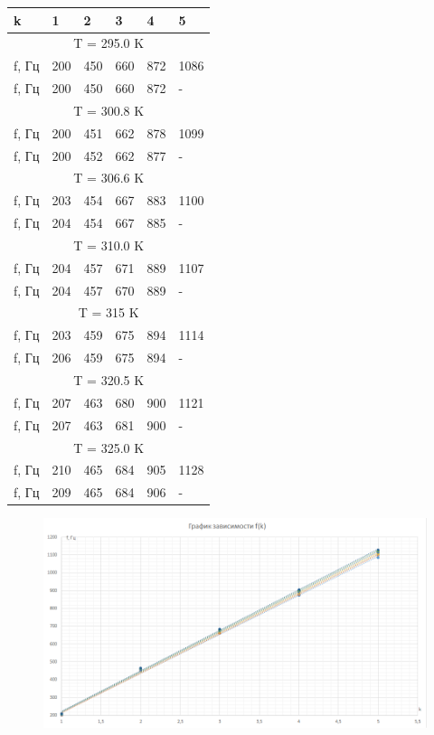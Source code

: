 \documentclass[12pt,a4paper]{article}
\begin{document}
\begin{center}

\begin{tabular}{|p{}|p{}|p{}|p{}|p{}|p{}|}
\hline 
k & 1  & 2 & 3 & 4 & 5 \\ 
\hline 
\multicolumn{6}{|c|}{T = 295.0 K} \\ 
\hline 
f, Гц  & 200 & 450 & 660 & 872 & 1086 \\ 
\hline 
f, Гц  & 200 & 450 & 660 & 872 & - \\ 
\hline 
\multicolumn{6}{|c|}{T = 300.8 K} \\ 
\hline 
f, Гц  & 200 & 451 & 662 & 878 & 1099 \\ 
\hline 
f, Гц  & 200 & 452 & 662 & 877 & -  \\ 
\hline 
\multicolumn{6}{|c|}{T = 306.6 K} \\ 
\hline 
f, Гц  & 203 & 454 & 667 & 883 & 1100 \\ 
\hline 
f, Гц  & 204 & 454 & 667 & 885 & - \\ 
\hline 
\multicolumn{6}{|c|}{T = 310.0 K} \\ 
\hline 
f, Гц  & 204 & 457 & 671 & 889 & 1107 \\ 
\hline 
f, Гц  & 204 & 457 & 670 & 889 & - \\ 
\hline 
\multicolumn{6}{|c|}{T = 315 K} \\ 
\hline 
f, Гц  & 203 & 459 & 675 & 894 & 1114 \\ 
\hline 
f, Гц  & 206 & 459 & 675 & 894 & - \\ 
\hline 
\multicolumn{6}{|c|}{T = 320.5 K} \\ 
\hline 
f, Гц  & 207 & 463 & 680 & 900 & 1121 \\ 
\hline 
f, Гц  & 207 & 463 & 681 & 900 & - \\ 
\hline 
\multicolumn{6}{|c|}{T = 325.0 K} \\ 
\hline 
f, Гц  & 210 & 465 & 684 & 905 & 1128  \\ 
\hline 
f, Гц  & 209 & 465 & 684 & 906 & -\\ 
\hline 
\end{tabular} 
\end{center}

\begin{figure}[H]
	\begin{center}
		\includegraphics[width=14cm]{2.1.3_gr_3}
	\end{center}
\end{figure}
\end{document}
